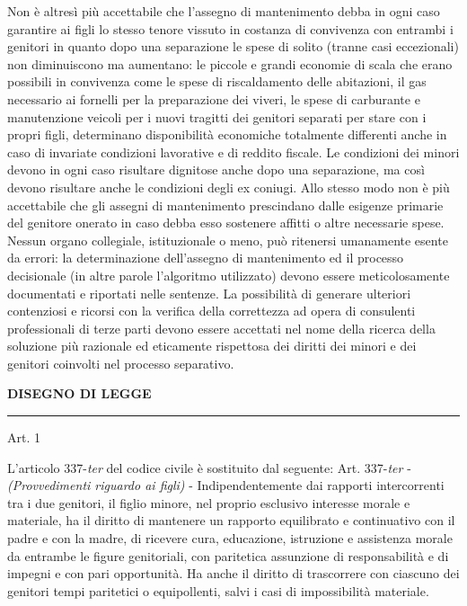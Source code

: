 \documentclass[twocolumn,12pt]{article}
\begin{document}
Non è altresì più accettabile che l'assegno di mantenimento debba in ogni caso garantire ai figli lo stesso tenore vissuto in costanza di convivenza con entrambi i genitori in quanto dopo una separazione le spese di solito (tranne casi eccezionali) non diminuiscono ma aumentano: le piccole e grandi economie di scala che erano possibili in convivenza come le spese di riscaldamento delle abitazioni, il gas necessario ai fornelli per la preparazione dei viveri, le spese di carburante e manutenzione veicoli per i nuovi tragitti dei genitori separati per stare con i propri figli, determinano disponibilità economiche totalmente differenti anche in caso di invariate condizioni lavorative e di reddito fiscale. Le condizioni dei minori devono in ogni caso risultare dignitose anche dopo una separazione, ma così devono risultare anche le condizioni degli ex coniugi. Allo stesso modo non è più accettabile che gli assegni di mantenimento prescindano dalle esigenze primarie del genitore onerato in caso debba esso sostenere affitti o altre necessarie spese.
\smallbreak
Nessun organo collegiale, istituzionale o meno, può ritenersi umanamente esente da errori: la determinazione dell'assegno di mantenimento ed il processo decisionale (in altre parole l'algoritmo utilizzato) devono essere meticolosamente documentati e riportati nelle sentenze. La possibilità di generare ulteriori contenziosi e ricorsi con la verifica della correttezza ad opera di consulenti professionali di terze parti devono essere accettati nel nome della ricerca della soluzione più razionale ed eticamente rispettosa dei diritti dei minori e dei genitori coinvolti nel processo separativo.

\bigbreak
{}

\clearpage

\begin{center}
    \textbf{DISEGNO DI LEGGE}
    \\\noindent\rule{2cm}{0.4pt}
    \smallbreak
\end{center}

\begin{center}
    Art. 1
\end{center}

L'articolo 337-\emph{ter} del codice civile è sostituito dal seguente:
\bigbreak
\guillemotleft Art. 337-\emph{ter} - \emph{(Provvedimenti riguardo ai figli)} -
Indipendentemente dai rapporti intercorrenti tra i due genitori, il figlio minore, nel proprio esclusivo interesse morale e materiale, ha il diritto di mantenere un rapporto equilibrato e continuativo con il padre e con la madre, di ricevere cura, educazione, istruzione e assistenza morale da entrambe le figure genitoriali, con paritetica assunzione di responsabilità e di impegni e con pari opportunità. Ha anche il diritto di trascorrere con ciascuno dei genitori tempi paritetici o equipollenti, salvi i casi di impossibilità materiale.
\end{document}
